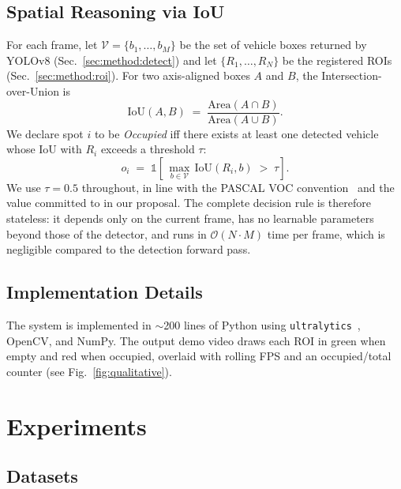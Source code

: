 \documentclass[10pt,twocolumn,letterpaper]{article}
\begin{document}
\subsection{Spatial Reasoning via IoU}
\label{sec:method:iou}

For each frame, let $\mathcal{V} = \{b_1, \ldots, b_M\}$ be the set of
vehicle boxes returned by YOLOv8 (Sec.~\ref{sec:method:detect}) and let
$\{R_1, \ldots, R_N\}$ be the registered ROIs (Sec.~\ref{sec:method:roi}).
For two axis-aligned boxes $A$ and $B$, the Intersection-over-Union is
\begin{equation}
    \mathrm{IoU}(A, B) \;=\;
    \frac{\mathrm{Area}(A \cap B)}{\mathrm{Area}(A \cup B)}.
    \label{eq:iou}
\end{equation}
We declare spot $i$ to be \emph{Occupied} iff there exists at least one
detected vehicle whose IoU with $R_i$ exceeds a threshold $\tau$:
\begin{equation}
    o_i \;=\; \mathds{1}\!\left[\,\max_{b \in \mathcal{V}}\,
                                  \mathrm{IoU}(R_i, b) \;>\; \tau \right].
    \label{eq:decision}
\end{equation}
We use $\tau = 0.5$ throughout, in line with the PASCAL VOC
convention~\cite{everingham2010pascal} and the value committed to in our
proposal. The complete decision rule is therefore stateless: it depends
only on the current frame, has no learnable parameters beyond those of the
detector, and runs in $\mathcal{O}(N \cdot M)$ time per frame, which is
negligible compared to the detection forward pass.

\subsection{Implementation Details}

The system is implemented in $\sim$200 lines of Python using
\texttt{ultralytics}~\cite{jocher2023yolov8}, OpenCV, and NumPy. The output
demo video draws each ROI in green when empty and red when occupied,
overlaid with rolling FPS and an occupied/total counter
(see Fig.~\ref{fig:qualitative}).

\section{Experiments}
\label{sec:experiments}

\subsection{Datasets}
\label{sec:exp:data}
\end{document}
